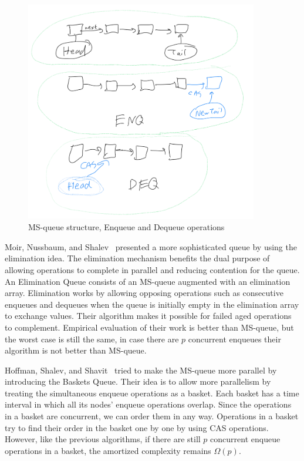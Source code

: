 \documentclass[12pt]{article}
\begin{document}
\begin{figure}[hbt]
  \center\includegraphics[width=4in]{pics/msq}
  \caption{MS-queue structure, Enqueue and Dequeue operations}
\end{figure}


Moir, Nussbaum, and Shalev~\cite{DBLP:conf/spaa/MoirNSS05} presented a more sophisticated queue by using the elimination idea. The elimination mechanism benefits the dual purpose of allowing operations to complete in parallel and reducing contention for the queue. An Elimination Queue consists of an MS-queue augmented with an elimination array. Elimination works by allowing opposing operations such as consecutive enqueues and dequeues when the queue is initially empty in the elimination array to exchange values. Their algorithm makes it possible for failed aged operations to complement. Empirical evaluation of their work is better than MS-queue, but the worst case is still the same, in case there are $p$ concurrent enqueues their algorithm is not better than MS-queue. 


Hoffman, Shalev, and Shavit~\cite{DBLP:conf/opodis/HoffmanSS07} tried to make the MS-queue more parallel by introducing the Baskets Queue. Their idea is to allow more parallelism by treating the simultaneous enqueue operations as a basket. Each basket has a time interval in which all its nodes’ enqueue operations overlap. Since the operations in a basket are concurrent, we can order them in any way. Operations in a basket try to find their order in the basket one by one by using CAS operations. However, like the previous algorithms, if there are still $p$ concurrent enqueue operations in a basket, the amortized complexity remains $\Omega(p)$.
\end{document}
